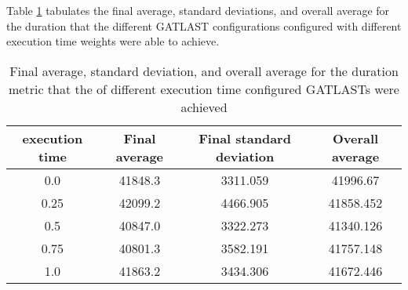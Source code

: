 Table \ref{tab:HP:GA:ExecutionTime:duration} tabulates the final average, standard deviations, and overall average for the duration that the different GATLAST configurations configured with different execution time weights were able to achieve.
\begin{table}[tbh!]
\centering
\begin{adjustbox}{trim=0cm 0cm 0cm 0cm, clip=true}
\begin{tabular}{|c|c|c|c|}
\hline
execution time & Final average & Final standard deviation & Overall average\\
\hline
0.0 & 41848.3 & 3311.059 & 41996.67\\\hline
0.25 & 42099.2 & 4466.905 & 41858.452\\\hline
0.5 & 40847.0 & 3322.273 & 41340.126\\\hline
0.75 & 40801.3 & 3582.191 & 41757.148\\\hline
1.0 & 41863.2 & 3434.306 & 41672.446\\\hline
\end{tabular}
\end{adjustbox}
\caption{Final average, standard deviation, and overall average for the duration metric that the of different execution time configured GATLASTs were achieved}
\label{tab:HP:GA:ExecutionTime:duration}
\end{table}